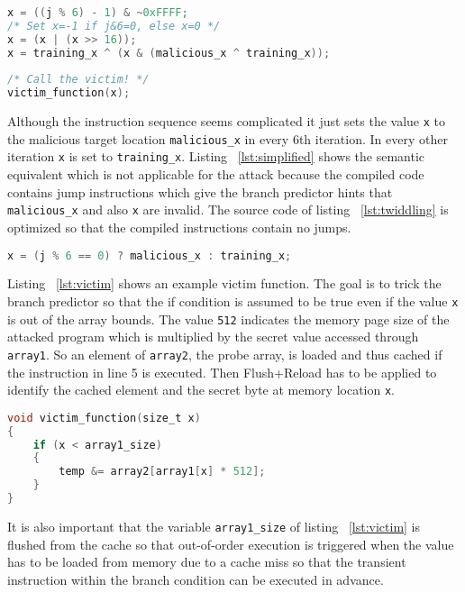 \documentclass[a4paper,oneside,openright] {scrreprt}
\begin{document}
\begin{lstlisting}[language=C, caption=Spectre: Branch Predictor Tricking, label={lst:twiddling}]
x = ((j % 6) - 1) & ~0xFFFF;
/* Set x=-1 if j&6=0, else x=0 */
x = (x | (x >> 16));
x = training_x ^ (x & (malicious_x ^ training_x));
    
/* Call the victim! */
victim_function(x);
\end{lstlisting}

Although the instruction sequence seems complicated it just sets the value \texttt{x} to the malicious target location 
\texttt{malicious\_x} in every 6th iteration. In every other iteration \texttt{x} is set to \texttt{training\_x}.
Listing ~\ref{lst:simplified} shows the semantic equivalent which is not applicable for the attack because the compiled code
contains jump instructions which give the branch predictor hints that \texttt{malicious\_x} and also \texttt{x} are invalid.
The source code of listing ~\ref{lst:twiddling} is optimized so that the compiled instructions contain no jumps.

\begin{lstlisting}[language=C, caption=Spectre: Branch Predictor Tricking Simplified, label={lst:simplified}]
x = (j % 6 == 0) ? malicious_x : training_x;
\end{lstlisting}

Listing ~\ref{lst:victim} shows an example victim function. The goal is to trick the branch predictor so that the if condition is 
assumed to be true even if the value \texttt{x} is out of the array bounds. The value \texttt{512} indicates the memory page size of the
attacked program which is multiplied by the secret value accessed through \texttt{array1}. So an element of \texttt{array2}, the probe array, is loaded
and thus cached if the instruction in line 5 is executed. Then Flush+Reload has to be applied to identify the cached element
and the secret byte at memory location \texttt{x}.

\begin{lstlisting}[language=C, caption=Spectre: Example Victim Gadget, label={lst:victim}]
void victim_function(size_t x)
{
    if (x < array1_size)
    {
        temp &= array2[array1[x] * 512];
    }
}
\end{lstlisting}

It is also important that the variable \texttt{array1\_size} of listing ~\ref{lst:victim} is flushed from the cache so that out-of-order
execution is triggered when the value has to be loaded from memory due to a cache miss so that the transient instruction within
the branch condition can be executed in advance.
\end{document}
